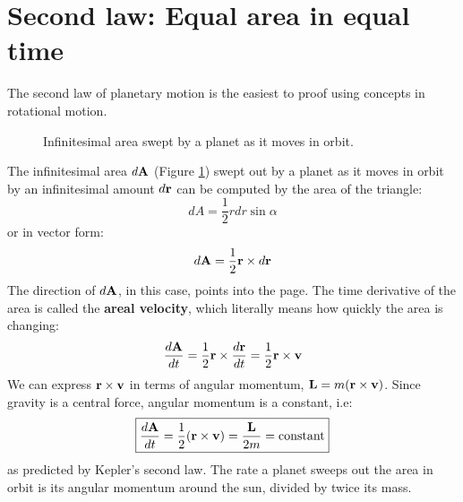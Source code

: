 \documentclass[11pt]{article}
\newcommand{\mb}[1]{
  \ensuremath\mathbf{#1}
}
\begin{document}
\section{Second law: Equal area in equal time}
The second law of planetary motion is the easiest to proof using concepts in
rotational motion.
\begin{figure}[ht]
  \begin{center}
    \end{center}
  \caption{Infinitesimal area swept by a planet as it moves in orbit.}
  \label{fig:dA}
\end{figure}
The infinitesimal area $d\mb{A}$ (Figure \ref{fig:dA}) swept out by a planet as
it moves in orbit by an infinitesimal amount $d\mb{r}$ can be computed by the
area of the triangle:
\begin{equation}
  dA=\frac{1}{2}rdr\sin\alpha
\end{equation}
or in vector form:
\begin{equation}
  d\mb{A}=\frac{1}{2}\mb{r}\times d\mb{r}
\end{equation}
The direction of $d\mb{A}$, in this case, points into the page. The time
derivative of the area is called the \textbf{areal velocity}, which literally
means how quickly the area is changing:
\begin{equation}
  \frac{d\mb{A}}{dt}
  =\frac{1}{2}\mb{r}\times\frac{d\mb{r}}{dt}
  =\frac{1}{2}\mb{r}\times\mb{v}
\end{equation}
We can express $\mb{r}\times\mb{v}$ in terms of angular momentum,
$\mb{L}=m(\mb{r}\times\mb{v})$. Since gravity is a central force, angular
momentum is a constant, i.e:
\begin{equation}
  \boxed{\frac{d\mb{A}}{dt}
    =\frac{1}{2}(\mb{r}\times\mb{v})=\frac{\mb{L}}{2m}=
    \text{constant}
  }
  \label{constant}
\end{equation}
as predicted by Kepler's second law. The rate a planet sweeps out the area in
orbit is its angular momentum around the sun, divided by twice its mass.
\end{document}
